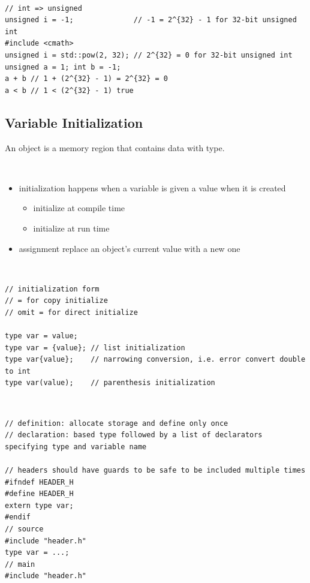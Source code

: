 \documentclass{blog}
\begin{document}
\begin{definition}~
    \begin{verbatim}
// int => unsigned
unsigned i = -1;              // -1 = 2^{32} - 1 for 32-bit unsigned int
#include <cmath>
unsigned i = std::pow(2, 32); // 2^{32} = 0 for 32-bit unsigned int
unsigned a = 1; int b = -1;
a + b // 1 + (2^{32} - 1) = 2^{32} = 0
a < b // 1 < (2^{32} - 1) true
\end{verbatim}
\end{definition}

\subsection{Variable Initialization}
\begin{definition}[object]
    An object is a memory region that contains data with type.
\end{definition}

\begin{definition}~
    \begin{itemize}
        \item initialization happens when a variable is given a value when it is created
              \begin{itemize}
                  \item initialize at compile time
                  \item initialize at run time
              \end{itemize}
        \item assignment replace an object's current value with a new one
    \end{itemize}
\end{definition}

\begin{definition}~
    \begin{verbatim}
// initialization form
// = for copy initialize
// omit = for direct initialize

type var = value;
type var = {value}; // list initialization
type var{value};    // narrowing conversion, i.e. error convert double to int
type var(value);    // parenthesis initialization
\end{verbatim}
\end{definition}

\begin{definition}~
    \begin{verbatim}
// definition: allocate storage and define only once
// declaration: based type followed by a list of declarators specifying type and variable name

// headers should have guards to be safe to be included multiple times
#ifndef HEADER_H
#define HEADER_H
extern type var;
#endif
// source
#include "header.h"
type var = ...;
// main
#include "header.h"
\end{verbatim}
\end{definition}
\end{document}
